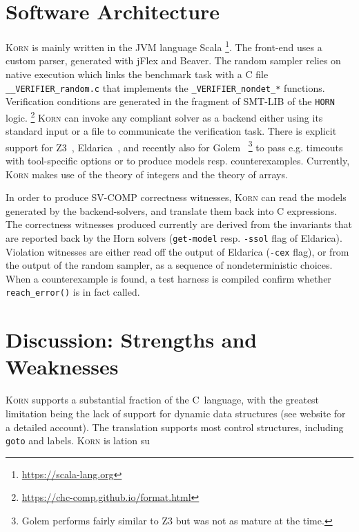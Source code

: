 \documentclass{llncs}
\newcommand{\Korn}{\textsc{Korn}\xspace}
\begin{document}
\section{Software Architecture}
\label{sec:architecture}

\Korn is mainly written in the JVM language Scala
    \footnote{\url{https://scala-lang.org}}.
The front-end uses a custom parser, generated with jFlex and Beaver.
The random sampler relies on native execution which links
the benchmark task with a C file \verb!__VERIFIER_random.c!
that implements the \verb!_VERIFIER_nondet_*! functions.
Verification conditions are generated in the fragment of SMT-LIB of the \texttt{HORN} logic.%
    \footnote{\url{https://chc-comp.github.io/format.html}}
\Korn can invoke any compliant solver as a backend either using its standard input or a file to communicate the verification task.
There is explicit support for Z3~\cite{gurfinkel2019science}, Eldarica~\cite{hojjat2018eldarica}, and recently also for Golem~\cite{blicha2022split}%
    \footnote{Golem performs fairly similar to Z3 but was not as mature at the time.}
to pass e.g. timeouts with tool-specific options or to produce models resp. counterexamples.
Currently, \Korn makes use of the theory of integers 
and the theory of arrays.

In order to produce SV-COMP correctness witnesses, \Korn can read the models generated by the backend-solvers, and translate them back into C expressions.
The correctness witnesses produced currently are derived from
the invariants that are reported back by the Horn solvers (\texttt{get-model} resp. \texttt{-ssol} flag of Eldarica).
Violation witnesses are either read off the output of Eldarica (\texttt{-cex} flag),
or from the output of the random sampler, as a sequence of nondeterministic choices.
When a counterexample is found, a test harness is compiled confirm whether \texttt{reach\_error()} is in fact called.

\section{Discussion: Strengths and Weaknesses}
\label{sec:discussion}

\Korn supports a substantial fraction of the C~language, with the greatest limitation
being the lack of support for dynamic data structures (see website for a detailed account).
The translation supports most control structures, including \texttt{goto} and labels.
\Korn is lation su
\end{document}
